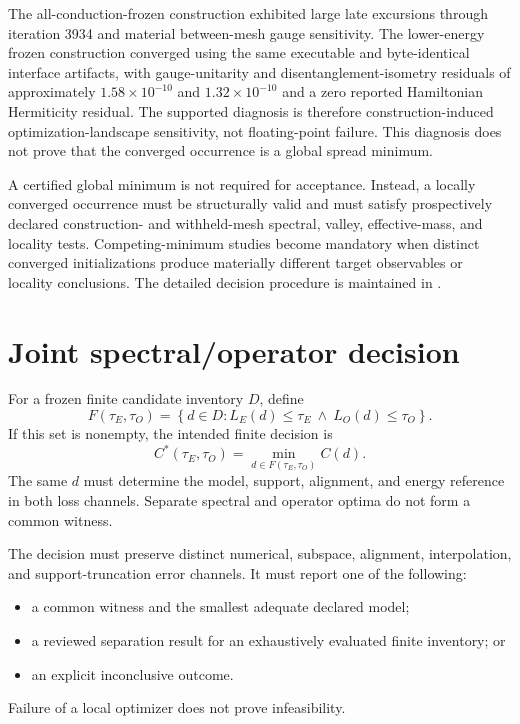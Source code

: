 \documentclass[11pt]{article}
\begin{document}
The all-conduction-frozen construction exhibited large late excursions through
iteration 3934 and material between-mesh gauge sensitivity.  The lower-energy frozen
construction converged using the same executable and byte-identical interface artifacts,
with gauge-unitarity and disentanglement-isometry residuals of approximately
$1.58\times10^{-10}$ and $1.32\times10^{-10}$ and a zero reported Hamiltonian
Hermiticity residual.  The supported diagnosis is therefore construction-induced
optimization-landscape sensitivity, not floating-point failure.  This diagnosis does
not prove that the converged occurrence is a global spread minimum.

A certified global minimum is not required for acceptance.  Instead, a locally
converged occurrence must be structurally valid and must satisfy prospectively declared
construction- and withheld-mesh spectral, valley, effective-mass, and locality tests.
Competing-minimum studies become mandatory when distinct converged initializations
produce materially different target observables or locality conclusions.  The detailed
decision procedure is maintained in
.

\section{Joint spectral/operator decision}

For a frozen finite candidate inventory $D$, define
\begin{equation}
  F(\tau_E,\tau_O)
  = \left\{d\in D:
      L_E(d)\leq\tau_E\ \land\ L_O(d)\leq\tau_O
    \right\}.
\end{equation}
If this set is nonempty, the intended finite decision is
\begin{equation}
  C^*(\tau_E,\tau_O)
  = \min_{d\in F(\tau_E,\tau_O)} C(d).
\end{equation}
The same $d$ must determine the model, support, alignment, and energy reference in both
loss channels.  Separate spectral and operator optima do not form a common witness.

The decision must preserve distinct numerical, subspace, alignment, interpolation, and
support-truncation error channels.  It must report one of the following:
\begin{itemize}
  \item a common witness and the smallest adequate declared model;
  \item a reviewed separation result for an exhaustively evaluated finite inventory;
    or
  \item an explicit inconclusive outcome.
\end{itemize}
Failure of a local optimizer does not prove infeasibility.
\end{document}
